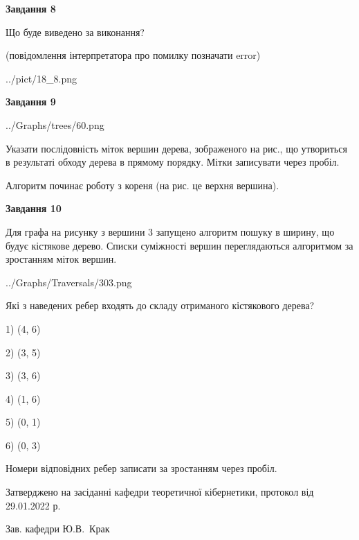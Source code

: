 \documentclass[12pt, ukrainian]{article}
\begin{document}
{\begin {large}
{\begin {center}\textbf{Завдання 8}\end {center}}\par
Що буде виведено за виконання?\par
 (повідомлення інтерпретатора про помилку позначати error)\par
\begin{center}
	{../pict/18_8.png}
\end{center}
\newpage

{\begin {center}\textbf{Завдання 9}\end {center}}\par

\begin{center}
	{../Graphs/trees/60.png}
\end{center}
Указати послідовність міток вершин дерева, зображеного на рис., що утвориться в результаті обходу дерева в прямому порядку. Мітки записувати через пробіл.\par Алгоритм починає роботу з кореня (на рис. це верхня вершина).\par
\newpage

{\begin {center}\textbf{Завдання 10}\end {center}}\par
Для графа на рисунку з вершини 3 запущено алгоритм пошуку в ширину, що будує кістякове дерево. Списки суміжності вершин переглядаються алгоритмом за зростанням міток вершин.\par
\begin{center}
	{../Graphs/Traversals/303.png}
\end{center}
\par Які з наведених ребер входять до складу отриманого кістякового дерева?\par
1) (4, 6)\par
2) (3, 5)\par
3) (3, 6)\par
4) (1, 6)\par
5) (0, 1)\par
6) (0, 3)\par
{\vskip 15pt} Номери відповідних ребер записати за зростанням через пробіл.\par
\newpage


\end {large}
}
{\smallskip \begin {small} Затверджено на засіданні кафедри теоретичної кібернетики, протокол  від   29.01.2022 р.\par\smallskip\smallskip
{\parbox {6.5 cm}{Зав. кафедри \dotfill Ю.В.~Крак}} \end{small}}
\end{document}
